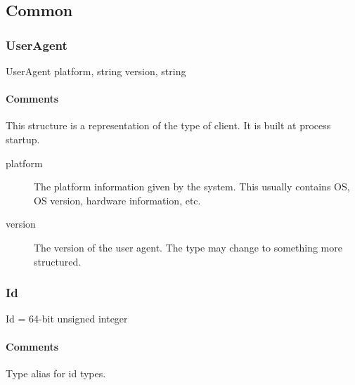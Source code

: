 \documentclass[a4paper,10pt]{article}
\begin{document}
\subsection{Common}
\label{sec:structure:common}

\subsubsection{UserAgent}

\begin{verbbox}
UserAgent
{
  platform, string
  version, string
}
\end{verbbox}
\begin{center}
\theverbbox
\end{center}

\begin{inparaitem}[ ]
 \item \infrastructure
\end{inparaitem}

\paragraph*{Comments}
This structure is a representation of the type of client. It is built at process startup.

\SpecialItem
\begin{description}
 \item[platform] The platform information given by the system. This usually contains OS, OS version, hardware information, etc.
 \item[version] The version of the user agent. The type may change to something more structured.
\end{description}

\subsubsection{Id}

\begin{verbbox}
Id = 64-bit unsigned integer
\end{verbbox}
\begin{center}
\theverbbox
\end{center}

\begin{inparaitem}[ ]
 \item \infrastructure
\end{inparaitem}

\paragraph*{Comments}
Type alias for id types.
\end{document}
